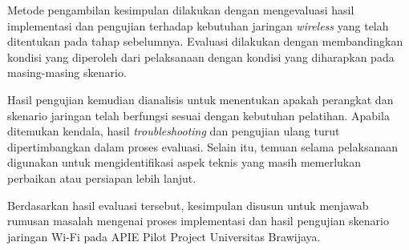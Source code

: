 Metode pengambilan kesimpulan dilakukan dengan mengevaluasi hasil implementasi dan
pengujian terhadap kebutuhan jaringan \textit{wireless} yang telah ditentukan pada
tahap sebelumnya. Evaluasi dilakukan dengan membandingkan kondisi yang diperoleh dari
pelaksanaan dengan kondisi yang diharapkan pada masing-masing skenario.

Hasil pengujian kemudian dianalisis untuk menentukan apakah perangkat dan skenario
jaringan telah berfungsi sesuai dengan kebutuhan pelatihan. Apabila ditemukan
kendala, hasil \textit{troubleshooting} dan pengujian ulang turut dipertimbangkan
dalam proses evaluasi. Selain itu, temuan selama pelaksanaan digunakan untuk
mengidentifikasi aspek teknis yang masih memerlukan perbaikan atau persiapan lebih
lanjut.

Berdasarkan hasil evaluasi tersebut, kesimpulan disusun untuk menjawab rumusan
masalah mengenai proses implementasi dan hasil pengujian skenario jaringan Wi-Fi
pada APIE Pilot Project Universitas Brawijaya.